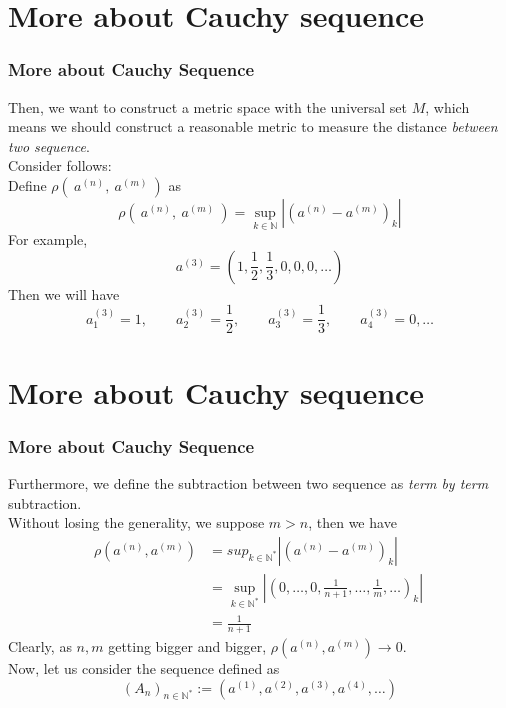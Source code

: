 \documentclass[12pt, t]{beamer}
\renewcommand{\emph}[1]{{\color{Turquoise3}\textsl{#1}}}
\begin{document}
\section{More about Cauchy sequence}
\begin{frame}
    \frametitle{More about Cauchy Sequence}
    Then, we want to construct a metric space with the universal set $M$, which means we should construct a reasonable metric to measure the distance \emph{between two sequence}.\\
    Consider follows:\\
    \hspace{1em} Define $\rho(\ a^{(n)},\ a^{(m)}\ )$ as
    \begin{equation*}
        \rho(\ a^{(n)},\ a^{(m)}\ )=\sup_{k\in \mathbb{N}}|(a^{(n)}-a^{(m)})_k|
    \end{equation*}
    For example,
    \begin{equation*}
        a^{(3)}=(1,\frac{1}{2},\frac{1}{3},0,0,0,\dots)
    \end{equation*}
    Then we will have
    \begin{equation*}
        a^{(3)}_1=1,\qquad a^{(3)}_2=\frac{1}{2},\qquad a^{(3)}_3=\frac{1}{3},\qquad a^{(3)}_4=0, \dots
    \end{equation*}



\end{frame}

\section{More about Cauchy sequence}
\begin{frame}
    \frametitle{More about Cauchy Sequence}
    Furthermore, we define the subtraction between two sequence as \emph{term by term} subtraction. \\
    Without losing the generality, we suppose $m>n$, then we have
    \begin{equation*}
        \begin{split}
            \rho(a^{(n)},a^{(m)})&=sup_{k\in \mathbb{N}^*}|(a^{(n)}-a^{(m)})_k|\\
            &=\sup_{k\in \mathbb{N}^*}|(0,\dots,0,\frac{1}{n+1},\dots,\frac{1}{m},\dots)_k|\\
            &=\frac{1}{n+1}
        \end{split}
        \
    \end{equation*}
    Clearly, as $n,m$ getting bigger and bigger, $\rho(a^{(n)},a^{(m)})\rightarrow0$.\\
    Now, let us consider the sequence defined as
    \begin{equation*}
        (A_n)_{n\in\mathbb{N}^*}:=(a^{(1)},a^{(2)},a^{(3)},a^{(4)},\dots)
    \end{equation*}
\end{frame}
\end{document}
